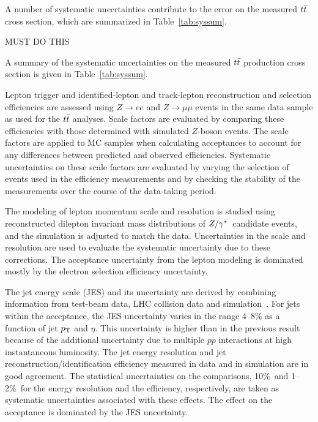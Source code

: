 A number of systematic uncertainties contribute to the error on the measured $t\bar{t}$ cross section, which are summarized in Table~\ref{tab:syssum}.

MUST DO THIS


A summary of the systematic uncertainties on the measured $t\bar{t}$ production cross section is given in Table~\ref{tab:syssum}.

Lepton trigger and identified-lepton and track-lepton
reconstruction and selection efficiencies are assessed using
$Z\rightarrow ee$ and $Z\rightarrow\mu\mu$ events in the same data
sample as used for the $t\bar{t}$ analyses.
Scale factors are evaluated by comparing these efficiencies with those determined with simulated $Z$-boson events. The scale factors are applied to MC samples when calculating
acceptances to account for any differences between predicted and observed efficiencies.  Systematic uncertainties on these scale factors are evaluated by varying the selection of events used in the efficiency measurements and by checking the stability of the measurements over the course of the data-taking period.

The modeling of lepton momentum scale and resolution is studied using
reconstructed dilepton invariant mass distributions of $Z/\gamma^{*}$\ candidate events, and
the simulation is adjusted to match the data.  Uncertainties in the scale and resolution are used to
evaluate the systematic uncertainty due to these corrections.
The acceptance uncertainty from the lepton modeling is dominated
mostly by the electron selection efficiency uncertainty.

The jet energy scale (JES) and its uncertainty are derived by
combining information from test-beam data, LHC collision data and
simulation~\cite{jetcor}.
For jets within the acceptance, the JES uncertainty varies
in the range 4--8\%
as a function of jet $p_{\mathrm{T}}$ and $\eta$. This uncertainty is higher than in the previous result~\cite{ATL-CONF-2011-034} because of the additional uncertainty due to multiple $pp$ interactions at high instantaneous luminosity. The jet energy
resolution and jet reconstruction/identification efficiency measured in data and in
simulation are in good agreement. The statistical uncertainties on the
comparisons,  10\%\ and 1--2\%\ for the energy resolution and the efficiency,
respectively, are taken as systematic uncertainties associated with these effects.
The effect on the acceptance is dominated by the JES uncertainty.


